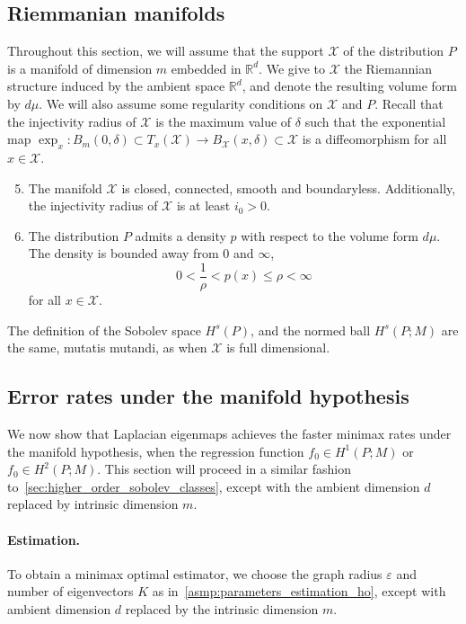 \documentclass{article}
\newcommand{\Reals}{\mathbb{R}}
\newcommand{\1}{\mathbf{1}}
\newcommand{\Rd}{\Reals^d}
\newcommand{\mc}[1]{\mathcal{#1}}
\theoremstyle{alden}
\theoremstyle{aldenthm}
\theoremstyle{definition}
\theoremstyle{remark}
\begin{document}
\subsection{Riemmanian manifolds}
Throughout this section, we will assume that the support $\mc{X}$ of the distribution $P$ is a manifold of dimension $m$ embedded in $\Rd$. We give to $\mc{X}$ the Riemannian structure induced by the ambient space $\Rd$, and denote the resulting volume form by $d\mu$.  We will also assume some regularity conditions on $\mc{X}$ and $P$. Recall that the injectivity radius of $\mc{X}$ is the maximum value of $\delta$ such that the exponential map $\exp_x: B_m(0,\delta) \subset T_x(\mc{X}) \to B_{\mc{X}}(x,\delta) \subset \mc{X}$ is a diffeomorphism for all $x \in \mc{X}$.
\begin{enumerate}[label=(A\arabic*)]
	\setcounter{enumi}{4}
	\item 
	\label{asmp:domain_manifold} The manifold $\mc{X}$ is closed, connected, smooth and boundaryless. Additionally, the injectivity radius of $\mc{X}$ is at least $i_0 > 0$.
	\item 
	\label{asmp:density_manifold} The distribution $P$ admits a density $p$ with respect to the volume form $d\mu$. The density is bounded away from $0$ and $\infty$,
	\begin{equation*}
	0 < \frac{1}{\rho} < p(x) \leq \rho < \infty
	\end{equation*}
	for all $x \in \mc{X}$.
\end{enumerate}
The definition of the Sobolev space $H^s(P)$, and the normed ball $H^s(P;M)$ are the same, mutatis mutandi, as when $\mc{X}$ is full dimensional. 

\subsection{Error rates under the manifold hypothesis}
We now show that Laplacian eigenmaps achieves the faster minimax rates under the manifold hypothesis, when the regression function $f_0 \in H^1(P;M)$ or $f_0 \in H^2(P;M)$. This section will proceed in a similar fashion to~\ref{sec:higher_order_sobolev_classes}, except with the ambient dimension $d$ replaced by intrinsic dimension $m$. 

\paragraph{Estimation.}
To obtain a minimax optimal estimator, we choose the graph radius $\varepsilon$ and number of eigenvectors $K$ as in~\ref{asmp:parameters_estimation_ho}, except with ambient dimension $d$ replaced by the intrinsic dimension $m$.
\end{document}

